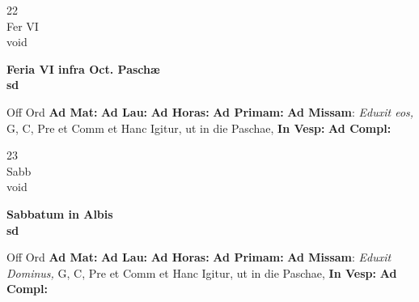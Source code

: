 \documentclass[10pt, openany]{book}
\begin{document}
    \begin{center}
        \begin{minipage}{3.5in}
            \vspace{2em}
            \begin{minipage}{0.5in}
                {\Huge 22} \\
                {\normalsize Fer VI} \\
                {\normalsize void}
            \end{minipage}
            \begin{minipage}{3.0in}
                \textbf{ \large Feria VI infra Oct. Paschæ \\
                \textnormal{\normalsize sd}} \\ 
            \end{minipage}
            \begin{justify}Off Ord
                \textbf{Ad Mat: }
                \textbf{Ad Lau: }
                \textbf{Ad Horas: }
                \textbf{Ad Primam: }\textbf{Ad Missam}: \textit{Eduxit eos,} G, C, Pre et Comm et Hanc Igitur, ut in die Paschae,  
                \textbf{In Vesp: }
                \textbf{Ad Compl: }
            \end{justify}
        \end{minipage}
    \end{center}

    \begin{center}
        \begin{minipage}{3.5in}
            \vspace{2em}
            \begin{minipage}{0.5in}
                {\Huge 23} \\
                {\normalsize Sabb} \\
                {\normalsize void}
            \end{minipage}
            \begin{minipage}{3.0in}
                \textbf{ \large Sabbatum in Albis \\
                \textnormal{\normalsize sd}} \\ 
            \end{minipage}
            \begin{justify}Off Ord
                \textbf{Ad Mat: }
                \textbf{Ad Lau: }
                \textbf{Ad Horas: }
                \textbf{Ad Primam: }\textbf{Ad Missam}: \textit{Eduxit Dominus,} G, C, Pre et Comm et Hanc Igitur, ut in die Paschae,  
                \textbf{In Vesp: }
                \textbf{Ad Compl: }
            \end{justify}
        \end{minipage}
    \end{center}
\end{document}
